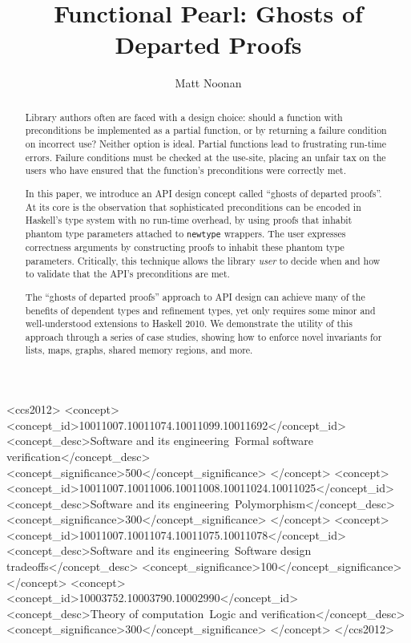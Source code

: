\documentclass[format=sigplan, review=false, screen=true]{acmart}
\begin{document}
\title[Ghosts of Departed Proofs]{Functional Pearl: Ghosts of Departed Proofs}

\author{Matt Noonan}


\begin{abstract}

  Library authors often are faced with a design choice: should a function with
  preconditions be implemented as a partial function, or by returning a failure
  condition on incorrect use? Neither option is ideal. Partial functions lead
  to frustrating run-time errors. Failure conditions must be checked
  at the use-site,
  placing an unfair tax on the users who have ensured that the function's
  preconditions were correctly met.
  
  In this paper, we introduce an API design concept called ``ghosts of departed
  proofs''. At its core is the observation that sophisticated preconditions can be
  encoded in Haskell's type system with no run-time overhead, by using proofs
  that inhabit phantom type parameters attached to \texttt{newtype} wrappers.
  The user expresses correctness arguments by constructing proofs to inhabit
  these phantom type parameters. Critically, this technique allows the
  library \emph{user} to decide when and how to validate that the API's preconditions
  are met.

  The ``ghosts of departed proofs'' approach to API design can achieve many of the benefits
  of dependent types and refinement types, yet only requires some minor and well-understood
  extensions to Haskell 2010. We demonstrate the utility of this approach
  through a series of case studies, showing how to enforce novel invariants for lists,
  maps, graphs, shared memory regions, and more.
\end{abstract}


%
%
 \begin{CCSXML}
<ccs2012>
<concept>
<concept_id>10011007.10011074.10011099.10011692</concept_id>
<concept_desc>Software and its engineering~Formal software verification</concept_desc>
<concept_significance>500</concept_significance>
</concept>
<concept>
<concept_id>10011007.10011006.10011008.10011024.10011025</concept_id>
<concept_desc>Software and its engineering~Polymorphism</concept_desc>
<concept_significance>300</concept_significance>
</concept>
<concept>
<concept_id>10011007.10011074.10011075.10011078</concept_id>
<concept_desc>Software and its engineering~Software design tradeoffs</concept_desc>
<concept_significance>100</concept_significance>
</concept>
<concept>
<concept_id>10003752.10003790.10002990</concept_id>
<concept_desc>Theory of computation~Logic and verification</concept_desc>
<concept_significance>300</concept_significance>
</concept>
</ccs2012>
\end{CCSXML}
\end{document}
